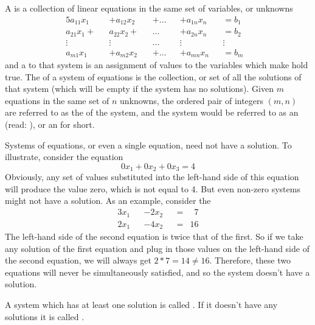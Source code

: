 \documentclass{ximera}
\begin{document}
\begin{definition}
  A  is a collection of linear equations in the same set of variables, or unknowns
  \begin{alignat*}{5}\tag{2}\label{eqn:sys}
    a_{11}x_1 &&+ a_{12}x_2 && + {}\ldots{} && + a_{1n}x_n && =  b_1 &\\
    a_{21}x_1 + && a_{22}x_2 + &&  {}\ldots{} && + a_{2n}x_n &&  = b_2 &\\
    \vdots &&  \vdots &&  {}\ldots{} &&  \vdots &&   \vdots &\\
    a_{m1}x_1 &&+ a_{m2}x_2 && + {}\ldots{} && + a_{mn}x_n && =  b_m &
  \end{alignat*}
  and a  to that system is an assignment of values to the variables which make  hold true. The  of a system of equations is the collection, or set of all the solutions of that system (which will be empty if the system has no solutions). Given $m$ equations in the same set of $n$ unknowns, the ordered pair of integers $(m,n)$ are referred to as the  of the system, and the system would be referred to as an  (read: ), or an  for short.
\end{definition}


\begin{example}
  Systems of equations, or even a single equation, need not have a solution. To illustrate, consider the equation
  \[
    0x_1 + 0x_2 + 0x_3 = 4
  \]
  Obviously, any set of values substituted into the left-hand side of
  this equation will produce the value zero, which is not equal to
  4. But even non-zero systems might not have a solution. As an
  example, consider the
  \begin{alignat*}{3}
    x_1 && - 2x_2 && =& \phantom{1}7 \\
    2x_1 && - 4x_2 && =& 16 
  \end{alignat*}
  The left-hand side of the second equation is twice that of the first. So if we take any solution of the first equation and plug in those values on the left-hand side of the second equation, we will always get $2*7 = 14\ne 16$. Therefore, these two equations will never be simultaneously satisfied, and so the system doesn't have a solution.
\end{example}

\begin{definition}
A system which has at least one solution is called . If it doesn't have any solutions it is called .
\end{definition}
\end{document}
